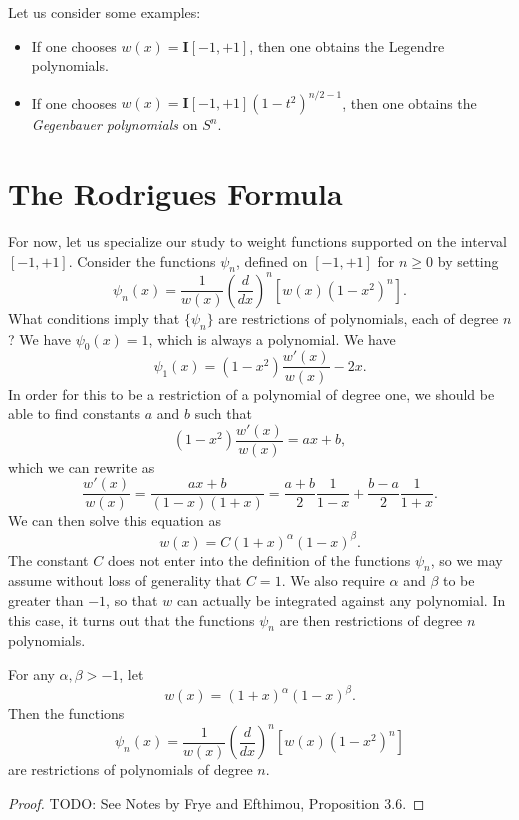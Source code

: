 Let us consider some examples:
%
\begin{itemize}
    \item If one chooses $w(x) = \mathbf{I}[-1,+1]$, then one obtains the Legendre polynomials.

    \item If one chooses $w(x) = \mathbf{I}[-1,+1] (1 - t^2)^{n/2 - 1}$, then one obtains the \emph{Gegenbauer polynomials} on $S^n$.
\end{itemize}



\section{The Rodrigues Formula}

For now, let us specialize our study to weight functions supported on the interval $[-1,+1]$. Consider the functions $\psi_n$, defined on $[-1,+1]$ for $n \geq 0$ by setting
%
\[ \psi_n(x) = \frac{1}{w(x)} \left( \frac{d}{dx} \right)^n [ w(x) (1 - x^2)^n ]. \]
%
What conditions imply that $\{ \psi_n \}$ are restrictions of polynomials, each of degree $n$? We have $\psi_0(x) = 1$, which is always a polynomial. We have
%
\[ \psi_1(x) = (1 - x^2) \frac{w'(x)}{w(x)} - 2x. \]
%
In order for this to be a restriction of a polynomial of degree one, we should be able to find constants $a$ and $b$ such that
%
\[ (1 - x^2) \frac{w'(x)}{w(x)} = ax + b, \]
%
which we can rewrite as
%
\[ \frac{w'(x)}{w(x)} = \frac{ax + b}{(1 - x)(1 + x)} = \frac{a + b}{2} \frac{1}{1 - x} + \frac{b - a}{2} \frac{1}{1 + x}. \]
%
We can then solve this equation as
%
\[ w(x) = C (1 + x)^\alpha (1 - x)^\beta. \]
%
The constant $C$ does not enter into the definition of the functions $\psi_n$, so we may assume without loss of generality that $C = 1$. We also require $\alpha$ and $\beta$ to be greater than $-1$, so that $w$ can actually be integrated against any polynomial. In this case, it turns out that the functions $\psi_n$ are then restrictions of degree $n$ polynomials.

\begin{theorem}
    For any $\alpha, \beta > -1$, let
    \[ w(x) = (1 + x)^\alpha (1 - x)^\beta. \]
    Then the functions
    \[ \psi_n(x) = \frac{1}{w(x)} \left( \frac{d}{dx} \right)^n [ w(x) (1 - x^2)^n ] \]
    are restrictions of polynomials of degree $n$.
\end{theorem}
\begin{proof}
    TODO: See Notes by Frye and Efthimou, Proposition 3.6.
\end{proof}

